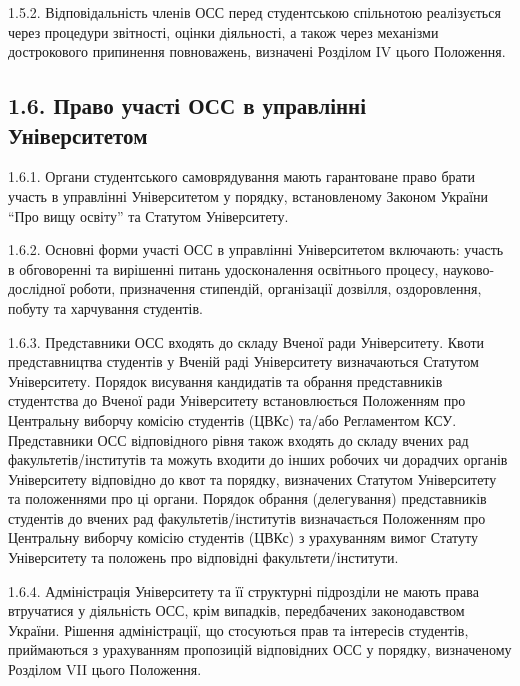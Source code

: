     1.5.2. Відповідальність членів ОСС перед студентською спільнотою реалізується через процедури звітності, оцінки діяльності, а також через механізми дострокового припинення повноважень, визначені Розділом IV цього Положення.

\subsection*{1.6. Право участі ОСС в управлінні Університетом}
    1.6.1. Органи студентського самоврядування мають гарантоване право брати участь в управлінні Університетом у порядку, встановленому Законом України ``Про вищу освіту'' та Статутом Університету.

    1.6.2. Основні форми участі ОСС в управлінні Університетом включають: участь в обговоренні та вирішенні питань удосконалення освітнього процесу, науково-дослідної роботи, призначення стипендій, організації дозвілля, оздоровлення, побуту та харчування студентів.

    1.6.3. Представники ОСС входять до складу Вченої ради Університету. Квоти представництва студентів у Вченій раді Університету визначаються Статутом Університету. Порядок висування кандидатів та обрання представників студентства до Вченої ради Університету встановлюється Положенням про Центральну виборчу комісію студентів (ЦВКс) та/або Регламентом КСУ. Представники ОСС відповідного рівня також входять до складу вчених рад факультетів/інститутів та можуть входити до інших робочих чи дорадчих органів Університету відповідно до квот та порядку, визначених Статутом Університету та положеннями про ці органи. Порядок обрання (делегування) представників студентів до вчених рад факультетів/інститутів визначається Положенням про Центральну виборчу комісію студентів (ЦВКс) з урахуванням вимог Статуту Університету та положень про відповідні факультети/інститути.

    1.6.4. Адміністрація Університету та її структурні підрозділи не мають права втручатися у діяльність ОСС, крім випадків, передбачених законодавством України. Рішення адміністрації, що стосуються прав та інтересів студентів, приймаються з урахуванням пропозицій відповідних ОСС у порядку, визначеному Розділом VII цього Положення.